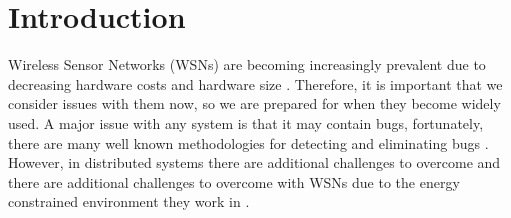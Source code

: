 \section{Introduction}

Wireless Sensor Networks (WSNs) are becoming increasingly prevalent due to decreasing hardware costs and hardware size \cite{TankBible}. Therefore, it is important that we consider issues with them now, so we are prepared for when they become widely used. A major issue with any system is that it may contain bugs, fortunately, there are many well known methodologies for detecting and eliminating bugs \cite{1382572, 749477, ?}. However, in distributed systems there are additional challenges to overcome \cite{5010224} and there are additional challenges to overcome with WSNs due to the energy constrained environment they work in \cite{?}.
